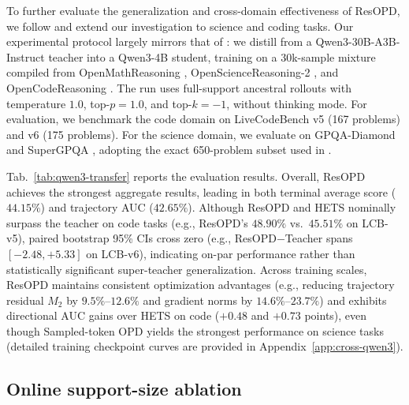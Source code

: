 To further evaluate the generalization and cross-domain effectiveness of ResOPD, we follow \citet{heo2026policy} and extend our investigation to science and coding tasks. Our experimental protocol largely mirrors that of \citet{heo2026policy}: we distill from a Qwen3-30B-A3B-Instruct \citep{yang2025qwen3} teacher into a Qwen3-4B student, training on a 30k-sample mixture compiled from OpenMathReasoning \citep{moshkov2025aimo}, OpenScienceReasoning-2 \citep{nvidia2025opensciencereasoning2}, and OpenCodeReasoning \citep{ahmad2025opencodereasoning}. The run uses full-support ancestral rollouts with temperature $1.0$, top-$p=1.0$, and top-$k=-1$, without thinking mode. For evaluation, we benchmark the code domain on LiveCodeBench \citep[LCB;][]{jain2025livecodebench} v5 (167 problems) and v6 (175 problems). For the science domain, we evaluate on GPQA-Diamond \citep[GPQA-D, 198 problems;][]{rein2023gpqa} and SuperGPQA \citep{du2026supergpqa}, adopting the exact 650-problem subset used in \citet{heo2026policy}.

Tab.~\ref{tab:qwen3-transfer} reports the evaluation results. Overall, ResOPD achieves the strongest aggregate results, leading in both terminal average score ($44.15\%$) and trajectory AUC ($42.65\%$). Although ResOPD and HETS nominally surpass the teacher on code tasks (e.g., ResOPD's $48.90\%$ vs.\ $45.51\%$ on LCB-v5), paired bootstrap 95\% CIs cross zero (e.g., ResOPD$-$Teacher spans $[-2.48, +5.33]$ on LCB-v6), indicating on-par performance rather than statistically significant super-teacher generalization.
Across training scales, ResOPD maintains consistent optimization advantages (e.g., reducing trajectory residual $M_2$ by $9.5\%$--$12.6\%$ and gradient norms by $14.6\%$--$23.7\%$) and exhibits directional AUC gains over HETS on code ($+0.48$ and $+0.73$ points), even though Sampled-token OPD yields the strongest performance on science tasks (detailed training checkpoint curves are provided in Appendix~\ref{app:cross-qwen3}).
\vspace{-2mm}

\subsection{Online support-size ablation}
\label{sec:online-support}

